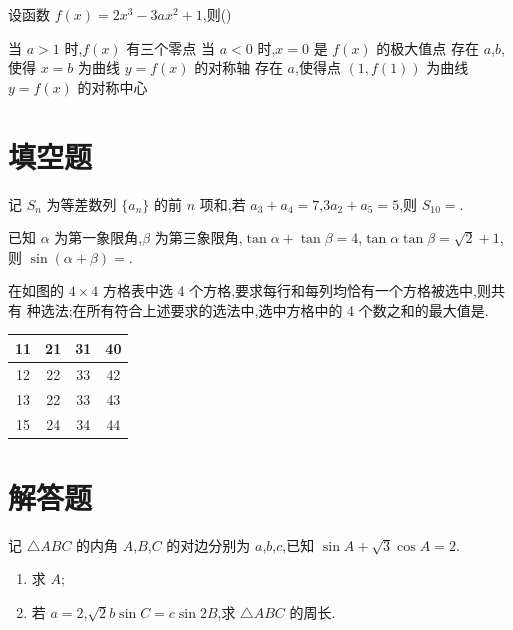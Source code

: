 \begin{problem}
设函数 \(f(x)=2x^3-3ax^2+1\),则(\quad)

\choices
    {当 \(a>1\) 时,\(f(x)\) 有三个零点}
    {当 \(a<0\) 时,\(x=0\) 是 \(f(x)\) 的极大值点}
    {存在 \(a\),\(b\),使得 \(x=b\) 为曲线 \(y=f(x)\) 的对称轴}
    {存在 \(a\),使得点 \((1,f(1))\) 为曲线 \(y=f(x)\) 的对称中心}
\end{problem}

\section{填空题}

\begin{problem}
记 \(S_n\) 为等差数列 \(\{a_n\}\) 的前 \(n\) 项和,若 \(a_3+a_4=7\),\(3a_2+a_5=5\),则 \(S_{10}=\)\fillinblank{}.
\end{problem}

\begin{problem}
已知 \(\alpha\) 为第一象限角,\(\beta\) 为第三象限角,\(\tan\alpha+\tan\beta=4\),\(\tan\alpha\tan\beta=\sqrt2+1\),则 \(\sin(\alpha+\beta)=\)\fillinblank{}.
\end{problem}

\begin{problem}
在如图的 \(4\times 4\) 方格表中选 4 个方格,要求每行和每列均恰有一个方格被选中,则共有\fillinblank{} 种选法;在所有符合上述要求的选法中,选中方格中的 4 个数之和的最大值是\fillinblank{}.

\begin{center}
\begin{tabular}{|c|c|c|c|}
\hline
11 & 21 & 31 & 40 \\
\hline
12 & 22 & 33 & 42 \\
\hline
13 & 22 & 33 & 43 \\
\hline
15 & 24 & 34 & 44 \\
\hline
\end{tabular}
\end{center}
\end{problem}

\section{解答题}

\begin{problem}
记 \(\triangle ABC\) 的内角 \(A\),\(B\),\(C\) 的对边分别为 \(a\),\(b\),\(c\),已知 \(\sin A+\sqrt3\cos A=2\).
\begin{enumerate}
\item 求 \(A\);
\item 若 \(a=2\),\(\sqrt2 b\sin C=c\sin 2B\),求 \(\triangle ABC\) 的周长.
\end{enumerate}
\end{problem}


